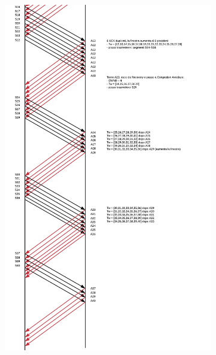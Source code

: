 \documentclass[10pt,a4paper]{article}
\begin{document}
\begin{enumerate}
\begin{figure}[H]
\begin{subfigure}[b]{9cm}
		\end{subfigure}
		\begin{subfigure}[b]{9cm}
		  \includegraphics[width=\textwidth]{Esame1262019_Conperdite2}
		\end{subfigure}
	  \end{figure}
	\end{enumerate}

	\newpage
\end{document}
